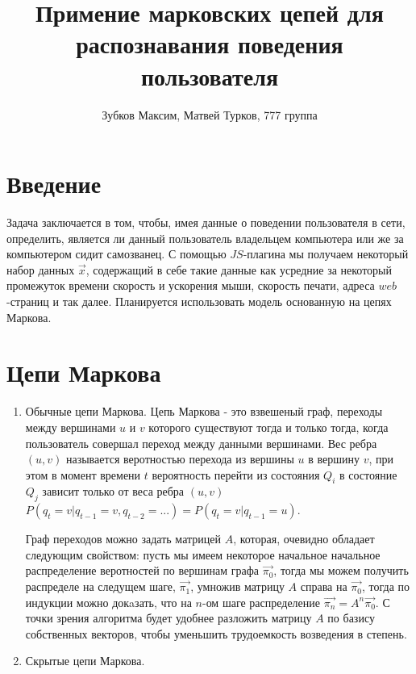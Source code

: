 \documentclass[a4paper,12pt]{article}
\title{Примение марковских цепей для распознавания поведения пользователя}
\author{Зубков Максим, Матвей Турков, 777 группа}
\begin{document}
\maketitle

\newcommand{\lineann}[5][0.5]{%
    \begin{scope}[rotate=#2, #5,inner sep=2pt]
        \draw[dashed, #5!40] (0,0) -- +(0,#1)
            node [coordinate, near end] (a) {};                       
        \draw[dashed, #5!20] (#3,0) -- +(0,#1)
            node [coordinate, near end] (b) {};
        \draw[|<->|] (a) -- node[fill=white] {#4} (b);
    \end{scope}
        
}
\maketitle


\section{Введение}

Задача заключается в том, чтобы, имея данные о поведении пользователя в сети, определить, является ли данный пользователь владельцем компьютера или же за компьютером сидит самозванец. С помощью $JS$-плагина мы получаем некоторый набор данных $\vec{x}$, содержащий в себе такие данные как усредние за некоторый промежуток времени  скорость и ускорения мыши, скорость печати, адреса $web$-страниц и так далее. Планируется использовать модель основанную на цепях Маркова.


\section{Цепи Маркова}

\begin{enumerate}

\item Обычные цепи Маркова. Цепь Маркова - это взвешеный граф, переходы между вершинами $u$ и $v$ которого существуют тогда и только тогда, когда пользователь совершал переход между данными вершинами. Вес ребра $(u, v)$ называется веротностью перехода из вершины $u$ в вершину $v$, при этом в момент времени $t$ вероятность перейти из состояния $Q_i$ в состояние $Q_j$ зависит только от веса ребра $(u,v)$ $P(q_{t} = v | q_{t-1} = v, q_{t-2} = ...) = P(q_{t} = v | q_{t-1} = u)$. 

Граф переходов можно задать матрицей $A$, которая, очевидно обладает следующим свойством: пусть мы имеем некоторое начальное начальное распределение веротностей по вершинам графа $\vec{\pi_0}$, тогда мы можем получить распределе на следущем шаге, $\vec{\pi_1}$, умножив матрицу $A$ справа на $\vec{\pi_0}$, тогда по индукции можно докaзать, что на $n$-ом шаге распределение $\vec{\pi_n} = A^{n}\vec{\pi_0}$. С точки зрения алгоритма будет удобнее разложить матрицу $A$ по базису собственных векторов, чтобы уменьшить трудоемкость возведения в степень. 

\item Скрытые цепи Маркова. 

\end{enumerate}
\end{document}
